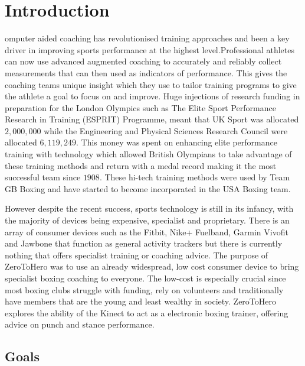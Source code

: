 %
%
\let\textcircled=\pgftextcircled
\chapter{Introduction}
\label{chap:intro}

omputer aided coaching has revolutionised training approaches and been a key driver in improving sports performance at the highest level.\cite{ISP}Professional athletes can now use advanced augmented coaching to accurately and reliably collect measurements that can then used as indicators of performance.\cite{aug0} This gives the coaching teams unique insight which they use to tailor training programs to give the athlete a goal to focus on and improve.
Huge injections of research funding in preparation for the London Olympics such as The Elite Sport Performance Research in Training (ESPRIT) Programme, meant that UK Sport was allocated \textsterling $2,000,000$  while the Engineering and Physical Sciences Research Council were allocated \textsterling $6,119,249$.\cite{EPSRC} \cite{aug5} 
This money was spent on enhancing elite performance training with technology \cite{aug3} \cite{aug4} which allowed British Olympians to take advantage of these training methods and return with a medal record making it the most successful team since $1908$.\cite{olymp1} These hi-tech training methods were used by Team GB Boxing \cite{aug2} and have started to become incorporated in the USA Boxing team.\cite{aug1}

However despite the recent success, sports technology is still in its infancy, with the majority of devices being expensive, specialist and proprietary\cite{aug7}. There is an array of consumer devices such as the Fitbit, Nike+ Fuelband, Garmin Vivofit and Jawbone that function as general activity trackers but there is currently nothing that offers specialist training or coaching advice. The purpose of ZeroToHero was to use an already widespread, low cost consumer device to bring specialist boxing coaching to everyone. The low-cost is especially crucial since most boxing clubs struggle with funding, rely on volunteers and traditionally have members that are the young and least wealthy in society. ZeroToHero explores the ability of the Kinect to act as a electronic boxing trainer, offering advice on punch and stance performance.
\section{Goals}
\label{sec:sec01}

